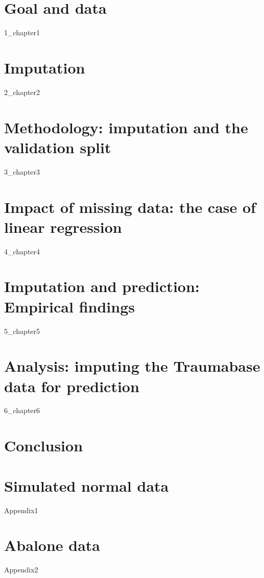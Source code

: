 \documentclass[12pt, a4paper]{memoir}
\begin{document}
\chapter{Goal and data}
\label{data}
 {1_chapter1}

\chapter{Imputation}
\label{imputation}
{2_chapter2}
		
\chapter{Methodology: imputation and the validation split}
\label{validation}
{3_chapter3}
		
		
\chapter{Impact of missing data: the case of linear regression}
\label{linreg}
{4_chapter4} 

\chapter{Imputation and prediction: Empirical findings}
\label{empirical}
{5_chapter5}

\chapter{Analysis: imputing the Traumabase data for prediction}
\label{analysis}
{6_chapter6}

\chapter*{Conclusion}


\begin{appendices}
\chapter{Simulated normal data}
\label{simulation}
{Appendix1}

\chapter{Abalone data}
\label{abalone}
{Appendix2}
\end{appendices}


\end{document}
